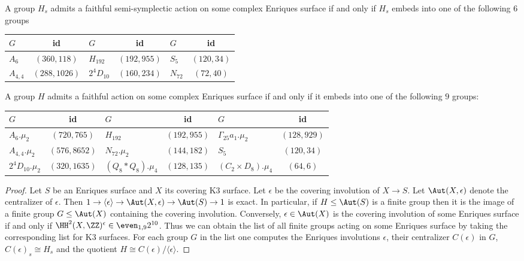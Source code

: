 \begin{corollary}
 A group $H_s$ admits a faithful semi-symplectic action on some complex Enriques surface if and only if $H_s$ embeds into one of the following $6$ groups

 \begin{center}
 \renewcommand{\arraystretch}{1.2}
 \begin{tabular}{lc|lc|lc}
 \toprule
 $G$ & id & $G$ & id& $G$ & id\\
 \hline
 $A_6$ & $(360, 118)$ &
 $H_{192}$  & $ (192, 955)$  &
 $S_5$ &  $ (120, 34)$ \\
 $A_{4,4}$ & $ (288, 1026)$ &
 $2^4D_{10}$ &  $ (160, 234)$ &
 $N_{72}$ &  $ (72, 40)$ \\
 \bottomrule
 \end{tabular}
 \end{center}


 A group $H$ admits a faithful action on some complex Enriques surface if and only if it embeds into one of the following $9$ groups:

 \begin{center}
 \renewcommand{\arraystretch}{1.2}
 \begin{tabular}{lc|lc|lc}
 \toprule
 $G$ & id & $G$ & id& $G$ & id\\
 \hline
 $A_6.\mu_2$ & $(720, 765)$ &
 $H_{192}$ &$(192, 955)$ &
 $\Gamma_{25}a_1.\mu_2$ & $(128, 929)$ \\
 $A_{4,4}.\mu_2$ & $(576, 8652)$ &
 $N_{72}.\mu_2$& $(144, 182)$&
 $S_5$& $(120, 34)$ \\
 $2^4D_{10}.\mu_2$ &$(320, 1635)$ &
 $(Q_8 * Q_8).\mu_4$ &$(128, 135)$ &
 $(C_2 \times D_8).\mu_4$ & $(64, 6)$ \\
 \bottomrule
 \end{tabular}
 \end{center}
\end{corollary}
\begin{proof}
 Let $S$ be an Enriques surface and $X$ its covering K3 surface. Let $\epsilon$ be the covering involution of $X \to S$. Let $\Aut(X,\epsilon)$ denote the centralizer of $\epsilon$.
 Then $1 \to \langle \epsilon \rangle \to \Aut(X,\epsilon) \to \Aut(S) \to 1$ is exact.
 In particular, if $H \leq \Aut(S)$ is a finite group then it is the image of a finite group $G \leq \Aut(X)$ containing the covering involution.
 Conversely, $\epsilon \in \Aut(X)$ is the covering involution of some Enriques surface
 if and only if $\HH^2(X,\ZZ)^\epsilon \in \even_{1,9}2^{10}$.
 Thus we can obtain the list of all finite groups acting on some Enriques surface by taking the corresponding list for K3 surfaces. For each group $G$ in the list one computes the Enriques involutions $\epsilon$, their centralizer $C(\epsilon)$ in $G$, $C(\epsilon)_s\cong H_s$ and the quotient $H\cong C(\epsilon)/\langle \epsilon \rangle$.
\end{proof}

